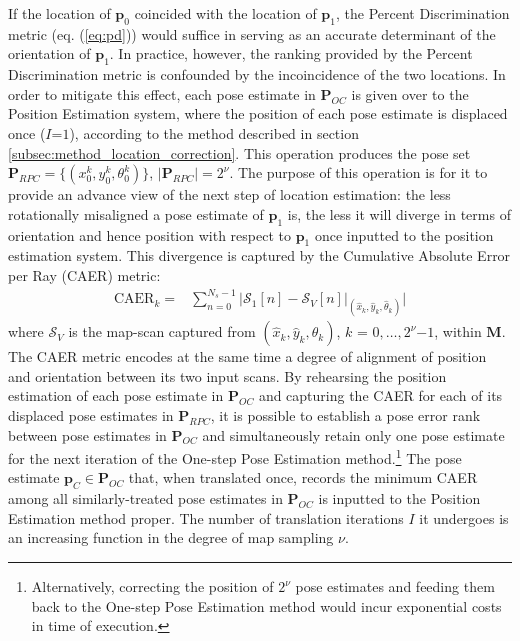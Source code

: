 If the location of $\bm{p}_0$ coincided with the location of $\bm{p}_1$, the
Percent Discrimination metric (eq. (\ref{eq:pd})) would suffice in serving as an
accurate determinant of the orientation of $\bm{p}_1$.  In practice, however,
the ranking provided by the Percent Discrimination metric is confounded by the
incoincidence of the two locations. In order to mitigate this effect, each pose
estimate in $\bm{P}_{OC}$ is given over to the Position Estimation
system, where the position of each pose estimate is displaced once ($I$=$1$),
according to the method described in section
\ref{subsec:method_location_correction}. This operation produces the pose set
$\bm{P}_{RPC} = \{(x_0^k, y_0^k, \theta_0^k)\}$, $|\bm{P}_{RPC}| = 2^\nu$. The
purpose of this operation is for it to provide an advance view of the next step
of location estimation: the less rotationally misaligned a pose estimate of
$\bm{p}_1$ is, the less it will diverge in terms of orientation and hence
position with respect to $\bm{p}_1$ once inputted to the position estimation
system. This divergence is captured by the Cumulative Absolute Error per Ray
(CAER) metric:
\begin{align} \text{CAER}_k =
  & \sum\limits_{n=0}^{N_s-1} \Bigg| \mathcal{S}_1[n] -
  \mathcal{S}_V[n]\Big|_{(\hat{x}_k, \hat{y}_k, \hat{\theta}_k)} \Bigg|
\end{align}
where $\mathcal{S}_V$ is the map-scan captured from $(\hat{x}_k, \hat{y}_k,
\hat{\theta}_k)$, $k$ = $0,\dots,2^\nu$$-$$1$, within $\bm{M}$. The CAER metric
encodes at the same time a degree of alignment of position and orientation
between its two input scans. By rehearsing the position estimation of each pose
estimate in $\bm{P}_{OC}$ and capturing the CAER for each of its displaced pose
estimates in $\bm{P}_{RPC}$, it is possible to establish a pose error rank
between pose estimates in $\bm{P}_{OC}$ and simultaneously retain only one pose
estimate for the next iteration of the One-step Pose Estimation
method.\footnote{Alternatively, correcting the position of $2^\nu$ pose
estimates and feeding them back to the One-step Pose Estimation method would
incur exponential costs in time of execution.} The pose estimate $\bm{p}_C \in
\bm{P}_{OC}$ that, when translated once, records the minimum CAER among all
similarly-treated pose estimates in $\bm{P}_{OC}$ is inputted to the Position
Estimation method proper. The number of translation iterations $I$ it undergoes
is an increasing function in the degree of map sampling $\nu$.

